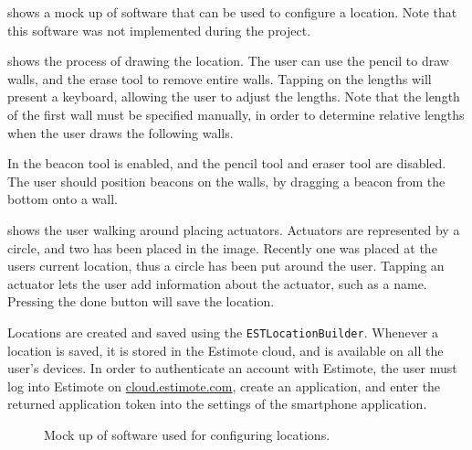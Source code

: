  shows a mock up of software that can be used to configure a location. 
Note that this software was not implemented during the project. 

 shows the process of drawing the location. 
The user can use the pencil to draw walls, 
and the erase tool to remove entire walls. 
Tapping on the lengths will present a keyboard, 
allowing the user to adjust the lengths. 
Note that the length of the first wall must be specified manually, 
in order to determine relative lengths when the user draws the following walls.

In  the beacon tool is enabled, 
and the pencil tool and eraser tool are disabled. 
The user should position beacons on the walls, 
by dragging a beacon from the bottom onto a wall.

 shows the user walking around placing actuators. 
Actuators are represented by a circle, 
and two has been placed in the image. 
Recently one was placed at the users current location, 
thus a circle has been put around the user. 
Tapping an actuator lets the user add information about the actuator, such as a name. 
Pressing the done button will save the location.

Locations are created and saved using the \texttt{ESTLocationBuilder}. 
Whenever a location is saved, 
it is stored in the Estimote cloud, 
and is available on all the user's devices. 
In order to authenticate an account with Estimote, 
the user must log into Estimote on \url{cloud.estimote.com}, 
create an application, 
and enter the returned application token into the settings of the smartphone application.

\begin{figure}[!htb]%
    \centering
    \caption{Mock up of software used for configuring locations.}
    \label{fig:configuration-location:add-room}
\end{figure}

